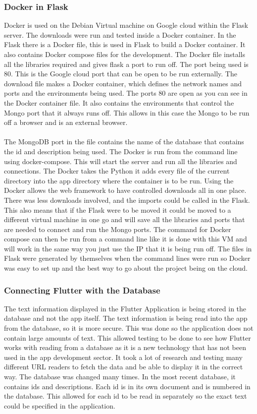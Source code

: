\subsubsection{Docker in Flask}
Docker is used on the Debian Virtual machine on Google cloud within the Flask server. The downloads were run and tested inside a Docker container. In the Flask there is a Docker file, this is used in Flask to build a Docker container. It also contains Docker compose files for the development. The Docker file installs all the libraries required and gives flask a port to run off. The port being used is 80.  This is the Google cloud port that can be open to be run externally. The download file makes a Docker container, which defines the network names and ports and the environments being used. The ports 80 are open as you can see in the Docker container file. It also contains the environments that control the Mongo port that it always runs off. This allows in this case the Mongo to be run off a browser and is an external browser. 
\paragraph{}The MongoDB port in the file contains the name of the database that contains the id and description being used. The Docker is run from the command line using docker-compose. This will start the server and run all the libraries and connections. The Docker takes the Python it adds every file of the current directory into the app directory where the container is to be run. Using the Docker allows the web framework to have controlled downloads all in one place. There was less downloads involved, and the imports could be called in the Flask. This also means that if the Flask were to be moved it could be moved to a different virtual machine in one go and will save all the libraries and ports that are needed to connect and run the Mongo ports. The command for Docker compose can then be run from a command line like it is done with this VM and will work in the same way you just use the IP that it is being run off. The files in Flask were generated by themselves when the command lines were run so Docker was easy to set up and the best way to go about the project being on the cloud. 

\subsubsection{Connecting Flutter with the Database}
The text information displayed in the Flutter Application is being stored in the database and not the app itself. The text information is being read into the app from the database, so it is more secure. This was done so the application does not contain large amounts of text. This allowed testing to be done to see how Flutter works with reading from a database as it is a new technology that has not been used in the app development sector. It took a lot of research and testing many different URL readers to fetch the data and be able to display it in the correct way. 
The database was changed many times. In the most recent database, it contains ids and descriptions. Each id is in its own document and is numbered in the database. This allowed for each id to be read in separately so the exact text could be specified in the application.
